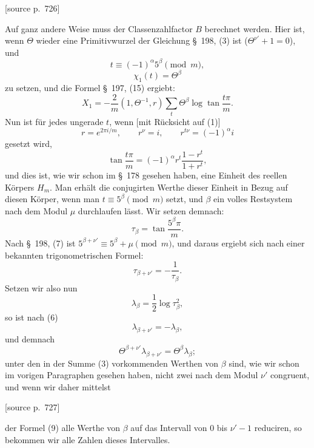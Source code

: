 \documentclass[11pt]{article}
\newcommand{\srcpage}[1]{\par\medskip\noindent\textsf{[source p.~#1]}\par\smallskip}
\begin{document}
\srcpage{726}
Auf ganz andere Weise muss der Classenzahlfactor $B$ berechnet werden. Hier ist, wenn $\Theta$ wieder eine Primitivwurzel der Gleichung \S~198, (3) ist ($\Theta^{\nu'}+1=0$), und
\begin{equation}
t\equiv(-1)^\alpha5^\beta\pmod m,
\tag{1}
\end{equation}
\begin{equation}
\chi_1(t)=\Theta^\beta
\tag{2}
\end{equation}
zu setzen, und die Formel \S~197, (15) ergiebt:
\begin{equation}
X_1=-\frac2m(1,\Theta^{-1},r)\sum_t\Theta^\beta\log\tan\frac{t\pi}{m}.
\tag{3}
\end{equation}
Nun ist für jedes ungerade $t$, wenn [mit Rücksicht auf (1)]
\[
r=e^{2\pi i/m},
\qquad
r^\nu=i,
\qquad
r^{t\nu}=(-1)^\alpha i
\]
gesetzt wird,
\begin{equation}
\tan\frac{t\pi}{m}=(-1)^\alpha r^t\frac{1-r^t}{1+r^t},
\tag{4}
\end{equation}
und dies ist, wie wir schon im \S~178 gesehen haben, eine Einheit des reellen Körpers $H_m$. Man erhält die conjugirten Werthe dieser Einheit in Bezug auf diesen Körper, wenn man $t\equiv5^\beta\pmod m$ setzt, und $\beta$ ein volles Restsystem nach dem Modul $\mu$ durchlaufen lässt. Wir setzen demnach:
\begin{equation}
\tau_\beta=\tan\frac{5^\beta\pi}{m}.
\tag{5}
\end{equation}
Nach \S~198, (7) ist $5^{\beta+\nu'}\equiv5^\beta+\mu\pmod m$, und daraus ergiebt sich nach einer bekannten trigonometrischen Formel:
\begin{equation}
\tau_{\beta+\nu'}=-\frac1{\tau_\beta}.
\tag{6}
\end{equation}
Setzen wir also nun
\begin{equation}
\lambda_\beta=\frac12\log\tau_\beta^2,
\tag{7}
\end{equation}
so ist nach (6)
\begin{equation}
\lambda_{\beta+\nu'}=-\lambda_\beta,
\tag{8}
\end{equation}
und demnach
\begin{equation}
\Theta^{\beta+\nu'}\lambda_{\beta+\nu'}=\Theta^\beta\lambda_\beta;
\tag{9}
\end{equation}
unter den in der Summe (3) vorkommenden Werthen von $\beta$ sind, wie wir schon im vorigen Paragraphen gesehen haben, nicht zwei nach dem Modul $\nu'$ congruent, und wenn wir daher mittelst
\srcpage{727}
der Formel (9) alle Werthe von $\beta$ auf das Intervall von 0 bis $\nu'-1$ reduciren, so bekommen wir alle Zahlen dieses Intervalles.
\end{document}
